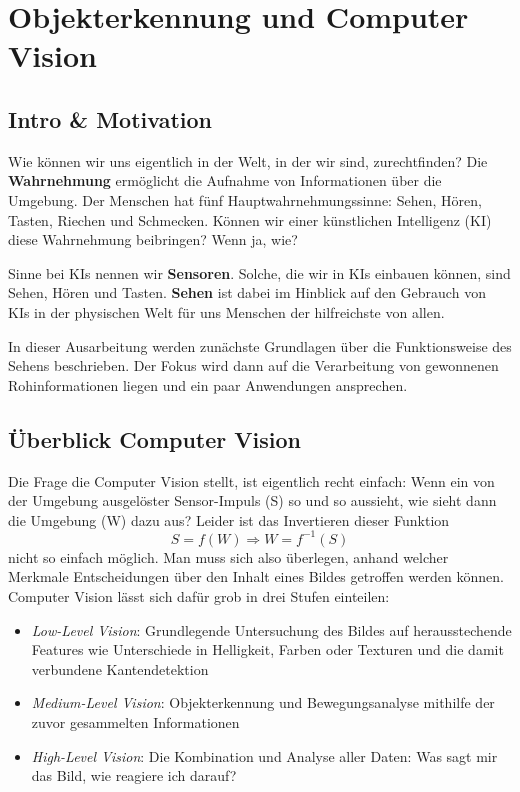 \usetikzlibrary{calc}
\usetikzlibrary{positioning}
\usetikzlibrary{matrix}
\usetikzlibrary{mindmap,trees,shapes,snakes}


\chapter{Objekterkennung und Computer Vision}
\section{Intro \& Motivation}
Wie können wir uns eigentlich in der Welt, in der wir sind, zurechtfinden? Die \textbf{Wahrnehmung} ermöglicht die Aufnahme von Informationen über die Umgebung. Der Menschen hat fünf Hauptwahrnehmungssinne: Sehen, Hören, Tasten, Riechen und Schmecken. Können wir einer künstlichen Intelligenz (KI) diese Wahrnehmung beibringen? Wenn ja, wie?

Sinne bei KIs nennen wir \textbf{Sensoren}. Solche, die wir in KIs einbauen können, sind Sehen, Hören und Tasten. \textbf{Sehen} ist dabei im Hinblick auf den Gebrauch von KIs in der physischen Welt für uns Menschen der hilfreichste von allen.

In dieser Ausarbeitung werden zunächste Grundlagen über die Funktionsweise des Sehens beschrieben. Der Fokus wird dann auf die Verarbeitung von gewonnenen Rohinformationen liegen und ein paar Anwendungen ansprechen.

\section{Überblick Computer Vision}
Die Frage die Computer Vision stellt, ist eigentlich recht einfach: Wenn ein von der Umgebung ausgelöster Sensor-Impuls (S) so und so aussieht, wie sieht dann die Umgebung (W) dazu aus? Leider ist das Invertieren dieser Funktion
\begin{equation*}
S = f(W) \Rightarrow W = f^{-1}(S)
\end{equation*}
nicht so einfach möglich. Man muss sich also überlegen, anhand welcher Merkmale Entscheidungen über den Inhalt eines Bildes getroffen werden können. Computer Vision lässt sich dafür grob in drei Stufen einteilen:
\begin{itemize}
\item \textit{Low-Level Vision}: Grundlegende Untersuchung des Bildes auf herausstechende Features wie Unterschiede in Helligkeit, Farben oder Texturen und die damit verbundene Kantendetektion
\item \textit{Medium-Level Vision}: Objekterkennung und Bewegungsanalyse mithilfe der zuvor gesammelten Informationen
\item \textit{High-Level Vision}: Die Kombination und Analyse aller Daten: Was sagt mir das Bild, wie reagiere ich darauf?
\end{itemize}

